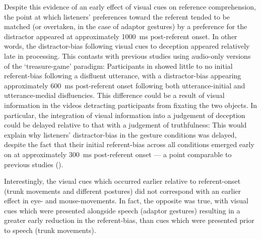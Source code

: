 \documentclass[a4paper,man,natbib]{apa6}
\begin{document}
Despite this evidence of an early effect of visual cues on reference comprehension, the point at which listeners' preferences toward the referent tended to be matched (or overtaken, in the case of adaptor gestures) by a preference for the distractor appeared at approximately 1000~ms post-referent onset. 
In other words, the distractor-bias following visual cues to deception appeared relatively late in processing.
This contasts with previous studies using audio-only versions of the `treasure-game' paradigm: Participants in \citet{Loy2017} showed little to no initial referent-bias following a disfluent utterance, with a distractor-bias appearing approximately 600~ms post-referent onset following both utterance-initial and utterance-medial disfluencies. 
This difference could be a result of visual information in the videos detracting participants from fixating the two objects. 
In particular, the integration of visual information into a judgement of deception could be delayed relative to that with a judgement of truthfulness: 
This would explain why listeners' distractor-bias in the gesture conditions was delayed, despite the fact that their initial referent-bias across all conditions emerged early on at approximately 300~ms post-referent onset --- a point comparable to previous studies (\citealt{Loy2017, King2018}). 


Interestingly, the visual cues which occurred earlier relative to referent-onset (trunk movements and different postures) did not correspond with an earlier effect in eye- and mouse-movements.
In fact, the opposite was true, with visual cues which were presented alongside speech (adaptor gestures) resulting in a greater early reduction in the referent-bias, than cues which were presented prior to speech (trunk movements).
\end{document}
